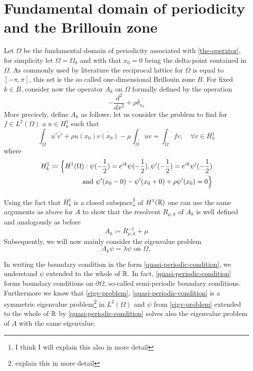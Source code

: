 \chapter{Fundamental domain of periodicity and the Brillouin zone}

Let $\Omega$ be the fundamental domain of periodicity associated with \eqref{the-operator}, for simplicity let $\Omega = \Omega_{0}$ and with that $x_{0} = 0$ being the delta-point contained in $\Omega$. As commonly used by literature the reciprocal lattice for $\Omega$ is equal to $[-\pi, \pi]$, this set is the so called one-dimensional Brillouin zone $B$. For fixed $k \in \overline{B}$, consider now the operator $A_{k}$ on $\Omega$ formally defined by the operation
		\[ -\frac{d^{2}}{dx^{2}} + \rho \delta_{x_{0}} \]
	More precicely, define $A_{k}$ as follows: let us consider the problem to find for $f \in L^{2}(\Omega)$ a $u \in H^{1}_{k}$ such that
	\[ \int_{\Omega} u' \overline{v'} + \rho u(x_{0}) \overline{v(x_{0})} - \mu \int_{\Omega} u v = \int_{\Omega} f v, \quad \forall v \in H^{1}_{k} \]
	where 
	\begin{eqnarray}
		H^{1}_{k} \coloneqq \Big\{ H^{1}(\Omega): \psi(-\frac{1}{2}) = e^{ik} \psi(-\frac{1}{2}), \psi'(-\frac{1}{2}) = e^{ik} \psi'(-\frac{1}{2}) \notag \\ \text{ and } \psi'(x_{0} - 0) - \psi'(x_{0} + 0) + \rho \psi'(x_{0}) = 0 \Big\} \label{quasi-periodic-condition}	
	\end{eqnarray}

 	Using the fact that $H^{1}_{k}$ is a closed subspace\footnote{I think I will explain this also in more detail} of $H^{1}(\mathbb{R})$ one can use the same arguments as above for $A$ to show that the resolvent $R_{\mu, k}$ of $A_{k}$ is well defined and analogously as before
		\[ A_{k} \coloneqq R_{\mu, k}^{-1} + \mu \]
	Subsequently, we will now mainly consider the eigenvalue problem
	\begin{equation}
		A_{k} \psi = \lambda \psi \text{ on } \Omega, \label{eigv-problem}
	\end{equation}

	In writing the boundary condition in the form \eqref{quasi-periodic-condition}, we understand $\psi$ extended to the whole of $\mathbb{R}$. In fact, \eqref{quasi-periodic-condition} forms boundary conditions on $\partial \Omega$, so-called semi-periodic boundary conditions. Furthermore we know that \eqref{eigv-problem}, \eqref{quasi-periodic-condition} is a symmetric eigenvalue problem\footnote{explain this in more detail} in $L^{2}(\Omega)$ and $\psi$ from \eqref{eigv-problem} extended to the whole of $\mathbb{R}$ by \eqref{quasi-periodic-condition} solves also the eigenvalue problem of $A$ with the same eigenvalue. \\
	
